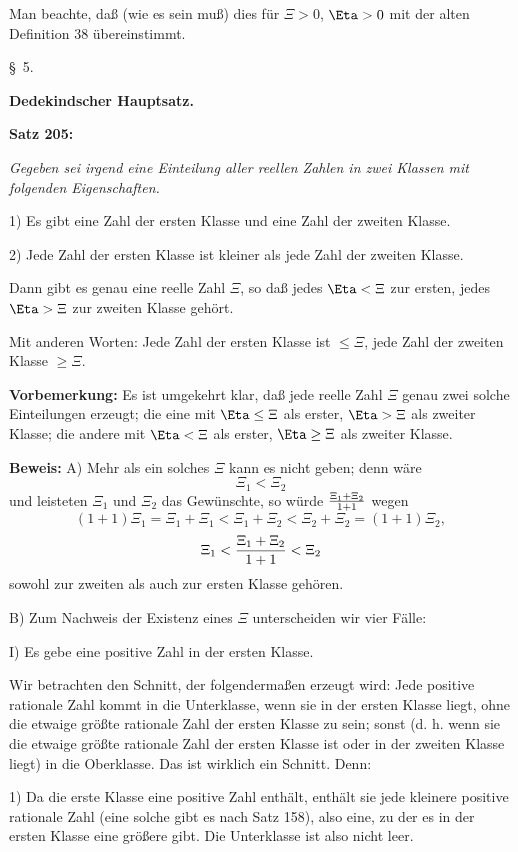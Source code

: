 Man beachte, da{\ss} (wie es sein mu{\ss}) dies f\"ur $\Xi > 0$, $\Eta > 0$ mit
der alten Definition 38 \"ubereinstimmt.
\vfill\eject



\line{}\baselineskip
\centerline{{\S}~5.}
\medskip

\centerline{\bf Dedekindscher Hauptsatz.}
\bigskip

{\bf Satz 205:} {\it Gegeben sei irgend eine Einteilung aller reellen Zahlen
in zwei Klassen mit folgenden Eigenschaften.

{\rm 1)} Es gibt eine Zahl der ersten Klasse und eine Zahl der zweiten
Klasse.

{\rm 2)} Jede Zahl der ersten Klasse ist kleiner als jede Zahl der
zweiten Klasse.

Dann gibt es genau eine reelle Zahl $\Xi$, so da{\ss} jedes $\Eta < \Xi$ zur
ersten, jedes $\Eta > \Xi$ zur zweiten Klasse geh\"ort.}

Mit anderen Worten: Jede Zahl der ersten Klasse ist $\le \Xi$,
jede Zahl der zweiten Klasse $\ge \Xi$.

{\bf Vorbemerkung:} Es ist umgekehrt klar, da{\ss} jede reelle Zahl
$\Xi$ genau zwei solche Einteilungen erzeugt; die eine mit $\Eta \le \Xi$
als erster, $\Eta > \Xi$ als zweiter Klasse; die andere mit $\Eta < \Xi$ als
erster, $\Eta \ge \Xi$ als zweiter Klasse.

{\bf Beweis:} A) Mehr als ein solches $\Xi$ kann es nicht geben; denn
w\"are
$$\Xi_1 < \Xi_2$$
und leisteten $\Xi_1$ und $\Xi_2$ das Gew\"unschte, so w\"urde $\Xi_1 + \Xi_2 \over 1 + 1$ wegen
$$(1 + 1)\Xi_1 = \Xi_1 + \Xi_1 < \Xi_1 + \Xi_2 < \Xi_2 + \Xi_2 = (1 + 1)\Xi_2,$$
$$\Xi_1 < {\Xi_1 + \Xi_2 \over 1 + 1} < \Xi_2$$
sowohl zur zweiten als auch zur ersten Klasse geh\"oren.

B) Zum Nachweis der Existenz eines $\Xi$ unterscheiden wir vier
F\"alle:

I) Es gebe eine positive Zahl in der ersten Klasse.

Wir betrachten den Schnitt, der folgenderma{\ss}en erzeugt wird:
Jede positive rationale Zahl kommt in die Unterklasse, wenn sie
in der ersten Klasse liegt, ohne die etwaige gr\"o{\ss}te rationale Zahl
der ersten Klasse zu sein; sonst (d. h. wenn sie die etwaige gr\"o{\ss}te
rationale Zahl der ersten Klasse ist oder in der zweiten Klasse
liegt) in die Oberklasse. Das ist wirklich ein Schnitt.  Denn:

1) Da die erste Klasse eine positive Zahl enth\"alt, enth\"alt sie
jede kleinere positive rationale Zahl (eine solche gibt es nach
Satz 158), also eine, zu der es in der ersten Klasse eine gr\"o{\ss}ere
gibt.  Die Unterklasse ist also nicht leer.

